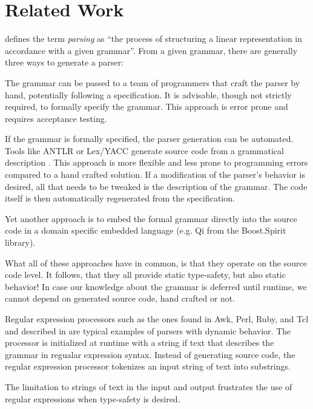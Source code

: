 \section{Related Work}

\cite{Grune:1990:PTP:130365} defines the term \emph{parsing} as \enquote{the
process of structuring a linear representation in accordance with a given
grammar}. From a given grammar, there are generally three ways to generate a
parser:

The grammar can be passed to a team of programmers that craft the parser by
hand, potentially following a specification. It is advisable, though not
strictly required, to formally specify the grammar. This approach is error prone
and requires acceptance testing.

If the grammar is formally specified, the parser generation can be automated.
Tools like ANTLR or Lex/YACC generate source code from a grammatical
description \cite{Johnson75yacc:yet, Parr95antlr:a}. This approach is more
flexible and less prone to programming errors compared to a hand crafted
solution. If a modification of the parser's behavior is desired, all that needs
to be tweaked is the description of the grammar. The code itself is then
automatically regenerated from the specification.

Yet another approach is to embed the formal grammar directly into the source
code in a domain specific embedded language (e.g. Qi from the Boost.Spirit
library).

What all of these approaches have in common, is that they operate on the source
code level. It follows, that they all provide static type-safety, but also
static behavior! In case our knowledge about the grammar is deferred until
runtime, we cannot depend on generated source code, hand crafted or not.

Regular expression processors such as the ones found in Awk, Perl, Ruby, and Tcl
and described in \cite{Friedl:2006:MRE:1209014} are typical examples of parsers
with dynamic behavior. The processor is initialized at runtime with a string if
text that describes the grammar in regualar expression syntax. Instead of
generating source code, the regular expression processor tokenizes an input
string of text into substrings.

The limitation to strings of text in the input and output frustrates the use of
regular expressions when type-safety is desired.

